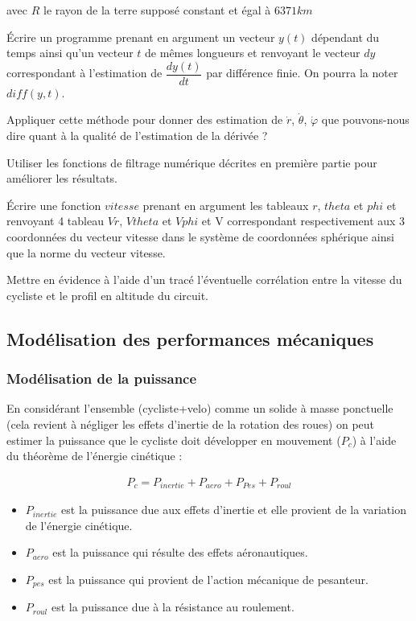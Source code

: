 avec $R$ le rayon de la terre supposé constant et égal à $6 371km$

\question{} Écrire un programme prenant en argument un vecteur $y(t)$ dépendant du temps ainsi qu'un vecteur $t$ de mêmes longueurs et renvoyant le vecteur $dy$ correspondant à l'estimation de $\dfrac{dy(t)}{dt}$ par différence finie. On pourra la noter $diff(y,t)$.

\question{} Appliquer cette méthode pour donner des estimation de $\dot{r}$, $\dot{\theta}$, $\dot{\varphi}$ que pouvons-nous dire quant à la qualité de l'estimation de la dérivée ?

\question{} Utiliser les fonctions de filtrage numérique décrites en première partie pour améliorer les résultats.

\question{} Écrire une fonction $vitesse$ prenant en argument les tableaux $r$, $theta$ et $phi$ et renvoyant 4 tableau $Vr$, $Vtheta$ et $Vphi$ et V correspondant respectivement aux 3 coordonnées du vecteur vitesse dans le système de coordonnées sphérique ainsi que la norme du vecteur vitesse.

\question{} Mettre en évidence à l'aide d'un tracé l'éventuelle corrélation entre la vitesse du cycliste et le profil en altitude du circuit.



\subsection{Modélisation des performances mécaniques}
\subsubsection{Modélisation de la puissance}

En considérant l'ensemble (cycliste+velo) comme un solide à masse ponctuelle (cela revient à négliger les effets d'inertie de la rotation des roues) on peut estimer la puissance que le cycliste doit développer en mouvement ($P_c$) à l'aide du théorème de l'énergie cinétique : 

\begin{align*}
P_c=P_{inertie}+P_{aero}+P_{Pes}+P_{roul}
\end{align*}

\begin{itemize}
\item $P_{inertie}$ est la puissance due aux effets d'inertie et elle provient de la variation de l'énergie cinétique. 
\item $P_{aero}$ est la puissance qui résulte des effets aéronautiques.
\item $P_{pes}$ est la puissance qui provient de l'action mécanique de pesanteur.
\item $P_{roul}$ est la puissance due à la résistance au roulement.
\end{itemize}

